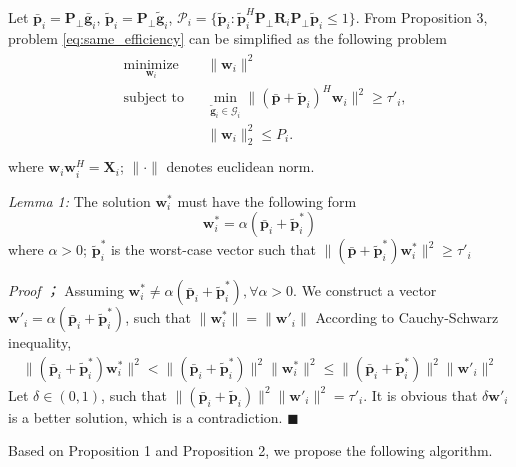 \documentclass[journal]{IEEEtran}
\begin{document}
Let $\bar{\mathbf{p}}_i = \mathbf{P}_{\perp}\bar{\mathbf{g}}_i$, $\tilde{\mathbf{p}}_i = \mathbf{P}_{\perp}\tilde{\mathbf{g}}_i$, $\mathcal{P}_i = \{\tilde{\mathbf{p}}_i:\tilde{\mathbf{p}}_i^H\mathbf{P}_{\perp}\mathbf{R}_i\mathbf{P}_{\perp}\tilde{\mathbf{p}}_i \leq 1 \}$. From Proposition 3, problem \eqref{eq:same_efficiency} can be simplified as the following problem
\begin{eqnarray}
\begin{aligned}  \label{eq:same_efficiency_vector}
& \underset{\mathbf{w}_i}{\text{minimize}}
& & \|\mathbf{w}_i\|^2\\
& \text{subject to}
& & \min_{\tilde{\mathbf{g}}_i \in \mathcal{G}_i}\|(\bar{\mathbf{p}}+\tilde{\mathbf{p}}_i)^H\mathbf{w}_i\|^2 \geq \tau'_i, \label{eq:interference_budget}\\
&&& \|\mathbf{w}_i\|_2^2 \leq P_i.\label{eq:power}\\ 
\end{aligned}
\end{eqnarray}
where $\mathbf{w}_i\mathbf{w}_i^H = \mathbf{X}_i$; $\|\cdot\|$ denotes euclidean norm.

\emph{Lemma 1:} The solution $\mathbf{w}_i^*$ must have the following form 
\begin{equation}
\mathbf{w}_i^* = \alpha (\bar{\mathbf{p}}
_i+\tilde{\mathbf{p}}_i^*)
\end{equation}
where $\alpha > 0$; $\tilde{\mathbf{p}}_i^*$ is the worst-case vector such that $\|(\bar{\mathbf{p}}+\tilde{\mathbf{p}}_i^*)\mathbf{w}_i^*\|^2 \geq \tau'_i$

\emph{Proof ；} Assuming $\mathbf{w}_i^* \neq \alpha (\bar{\mathbf{p}}
_i+\tilde{\mathbf{p}}_i^*), \forall \alpha > 0$. We construct a vector $\mathbf{w}'_i = \alpha (\bar{\mathbf{p}}
_i+\tilde{\mathbf{p}}_i^*)$, such that $\|\mathbf{w}_i^*\| =\|\mathbf{w}'_i\|$ According to Cauchy-Schwarz inequality, 
\begin{eqnarray}
\|(\bar{\mathbf{p}}
_i+\tilde{\mathbf{p}}_i^*)\mathbf{w}_i^*\|^2 < \|(\bar{\mathbf{p}}
_i+\tilde{\mathbf{p}}_i^*)\|^2\|\mathbf{w}_i^*\|^2 \leq \|(\bar{\mathbf{p}}
_i+\tilde{\mathbf{p}}_i^*)\|^2\|\mathbf{w}'_i\|^2
\end{eqnarray}
Let $\delta \in (0,1)$, such that $\|(\bar{\mathbf{p}}
_i+\tilde{\mathbf{p}}_i)\|^2\|\mathbf{w}'_i\|^2 = \tau'_i$. It is obvious that $\delta\mathbf{w}'_i$ is a better solution, which is a contradiction. $\blacksquare$


Based on Proposition 1 and Proposition 2, we propose the following algorithm.
\end{document}

